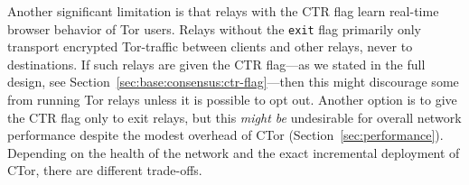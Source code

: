 Another significant limitation is that relays with the CTR flag learn real-time
browser behavior of Tor users. Relays without the \texttt{exit} flag primarily
only transport encrypted Tor-traffic between clients and other relays, never to
destinations. If such relays are given the CTR flag---as we stated in the full
design, see Section~\ref{sec:base:consensus:ctr-flag}---then this might
discourage some from running Tor relays unless it is possible to opt out.
Another option is to give the CTR flag only to exit relays, but this \emph{might
be} undesirable for overall network performance despite the modest overhead of
CTor (Section~\ref{sec:performance}). Depending on the health of the network and
the exact incremental deployment of CTor, there are different trade-offs.
